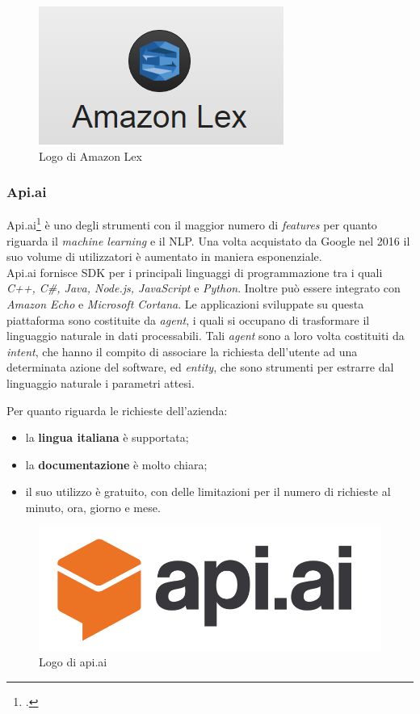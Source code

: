 \begin{figure}[h]
	\centering
	\includegraphics[scale=0.5]{../Immagini/amazon-lex.png}
	\caption{Logo di Amazon Lex}
\end{figure}

\subsubsection{Api.ai}
Api.ai\footcite{apiai} è uno degli strumenti con il maggior numero di \emph{features} per quanto riguarda il \emph{machine learning} e il \gls{NLP}. Una volta acquistato da Google nel 2016 il suo volume di utilizzatori è aumentato in maniera esponenziale. \\
Api.ai fornisce SDK per i principali linguaggi di programmazione tra i quali \emph{C++, C\#, Java, Node.js, JavaScript} e \emph{Python}. Inoltre può essere integrato con \emph{Amazon Echo} e \emph{Microsoft Cortana}. Le applicazioni sviluppate su questa piattaforma sono costituite da \emph{agent}, i quali si occupano di trasformare il linguaggio naturale in dati processabili. Tali \emph{agent} sono a loro volta costituiti da \emph{intent}, che hanno il compito di associare la richiesta dell'utente ad una determinata azione del software, ed \emph{entity}, che sono strumenti per estrarre dal linguaggio naturale i parametri attesi.

Per quanto riguarda le richieste dell'azienda:
\begin{itemize}
	\item la \textbf{lingua italiana} è supportata;
	\item la \textbf{documentazione} è molto chiara;
	\item il suo utilizzo è gratuito, con delle limitazioni per il numero di richieste al minuto, ora, giorno e mese.
\end{itemize}

\begin{figure}[h]
	\centering
	\includegraphics[scale=0.25]{../Immagini/apiai.png}
	\caption{Logo di api.ai}
\end{figure}


